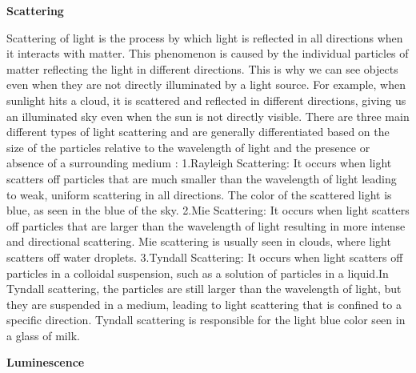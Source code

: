 \documentclass{article}
\begin{document}
{                \textbf{Scattering}
                \vspace*{1\baselineskip}
                
                \hspace{0.5cm}Scattering of light is the process by which light is reflected in all directions when it interacts with matter. This phenomenon is caused by the individual particles of matter reflecting the light in different directions. This is why we can see objects even when they are not directly illuminated by a light source. For example, when sunlight hits a cloud, it is scattered and reflected in different directions, giving us an illuminated sky even when the sun is not directly visible. There are three main different types of light scattering and are generally differentiated based on the size of the particles relative to the wavelength of light and the presence or absence of a surrounding medium : 1.Rayleigh Scattering: It occurs when light scatters off particles that are much smaller than the wavelength of light leading to weak, uniform scattering in all directions. The color of the scattered light is blue, as seen in the blue of the sky. 2.Mie Scattering: It occurs when light scatters off particles that are larger than the wavelength of light resulting in more intense and directional scattering. Mie scattering is usually seen in clouds, where light scatters off water droplets. 3.Tyndall Scattering: It occurs when light scatters off particles in a colloidal suspension, such as a solution of particles in a liquid.In Tyndall scattering, the particles are still larger than the wavelength of light, but they are suspended in a medium, leading to light scattering that is confined to a specific direction. Tyndall scattering is responsible for the light blue color seen in a glass of milk.\par
                \vspace*{1\baselineskip}
                
                \textbf{Luminescence}
                \vspace*{1\baselineskip}
                
}
\end{document}
